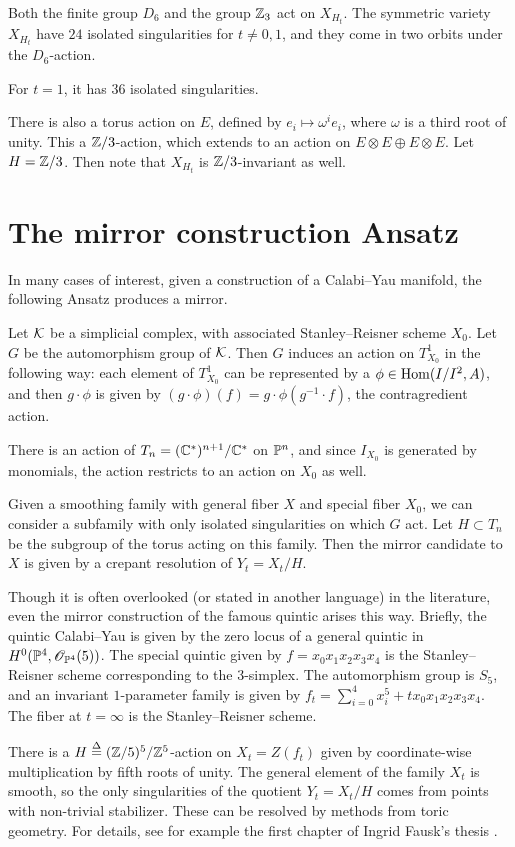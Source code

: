 \begin{proposition}
Both the finite group $D_6$ and the group $\Z_3$ act on $X_{H_t}$. The symmetric variety $X_{H_t}$ have $24$ isolated singularities for $t \neq 0,1$, and they come in two orbits under the $D_6$-action.

For $t=1$, it has $36$ isolated singularities.
\end{proposition}

There is also a torus action on $E$, defined by $e_i \mapsto \omega^i e_i$, where $\omega$ is a third root of unity. This a $\Z/3$-action, which extends to an action on $ E\otimes E \oplus E \otimes E$. Let $H=\Z/3$. Then note that $X_{H_t}$ is $\Z/3$-invariant as well. 



\section{The mirror construction Ansatz} %
\label{sec:the_mirror_construction_ansatz}

In many cases of interest, given a construction of a Calabi--Yau manifold, the following Ansatz produces a mirror.

Let $\K$ be a simplicial complex, with associated Stanley--Reisner scheme $X_0$. Let $G$ be the automorphism group of $\K$. Then $G$ induces an action on $T_{X_0}^1$ in the following way: each element of $T_{X_0}^1$ can be represented by a $\phi \in \Hom(I/I^2,A)$, and then $g \cdot \phi$ is given by $(g \cdot \phi)(f) = g \cdot \phi(g^{-1} \cdot f)$, the contragredient action.

There is an action of $T_n=(\C^\ast)^{n+1}/\C^\ast$ on $\P^n$, and since $I_{X_0}$ is generated by monomials, the action restricts to an action on $X_0$ as well.

Given a smoothing family with general fiber $X$ and special fiber $X_0$, we can consider a subfamily with only isolated singularities on which $G$ act.  Let $H \subset T_n$ be the subgroup of the torus acting on this family. Then the mirror candidate to $X$ is given by a crepant resolution of $Y_t=X_t/H$.

Though it is often overlooked (or stated in another language) in the literature, even the mirror construction of the famous quintic arises this way. Briefly, the quintic Calabi--Yau is given by the zero locus of a general quintic in $H^0(\P^4,\OO_{\P^4}(5))$. The special quintic given by $f=x_0x_1x_2x_3x_4$ is the Stanley--Reisner scheme corresponding to the 3-simplex. The automorphism group is $S_5$, and an invariant $1$-parameter family is given by $f_t=\sum_{i=0}^4 x_i^5 + t x_0 x_1x_2x_3x_4$. The fiber at $t=\infty$ is the Stanley--Reisner scheme.

There is a $H \stackrel \Delta = (\Z/5)^5/\Z^5$-action on $X_t = Z(f_t)$ given by coordinate-wise multiplication by fifth roots of unity. The general element of the family $X_t$ is smooth, so the only singularities of the quotient $Y_t=X_t/H$ comes from points with non-trivial stabilizer. These can be resolved by methods from toric geometry. For details, see for example the first chapter of Ingrid Fausk's thesis \cite{fausk_thesis}.